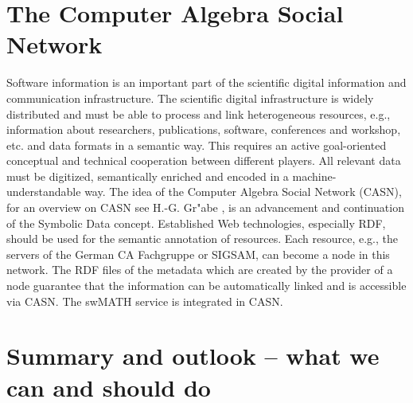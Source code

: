 \documentclass[12pt]{article}
\begin{document}
\section{The Computer Algebra Social Network}
Software information is an important part of the scientific digital information
and communication infrastructure. The scientific digital infrastructure is
widely distributed and must be able to process and link heterogeneous
resources, e.g., information about researchers, publications, software,
conferences and workshop, etc. and data formats in a semantic way.  This
requires an active goal-oriented conceptual and technical cooperation between
different players. All relevant data must be digitized, semantically enriched
and encoded in a machine-understandable way.  The idea of the Computer Algebra
Social Network (CASN), for an overview on CASN see H.-G. Gr"abe \cite{CASN}, is
an advancement and continuation of the Symbolic Data concept. Established Web
technologies, especially RDF, should be used for the semantic annotation of
resources. Each resource, e.g., the servers of the German CA Fachgruppe or
SIGSAM, can become a node in this network. The RDF files of the metadata which
are created by the provider of a node guarantee that the information can be
automatically linked and is accessible via CASN. The swMATH service is
integrated in CASN.

\section{Summary and outlook -- what we can and should do}
\end{document}
